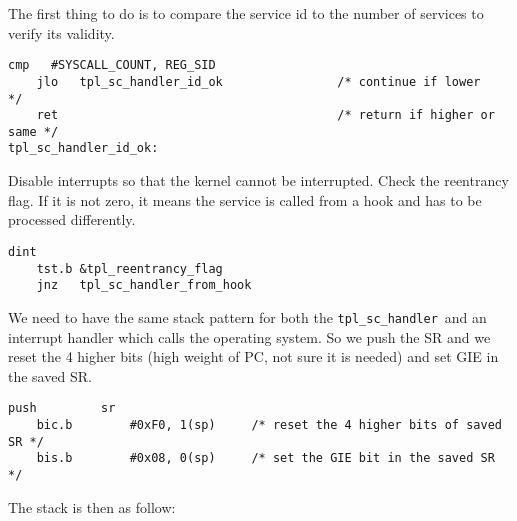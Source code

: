 \documentclass[11pt, oneside]{article}   	%
\newcommand{\sch}{\lstinline{tpl_sc_handler}}
\begin{document}

\vspace{1em}

The first thing to do is to compare the service id to the number of services to verify its validity.

\begin{lstlisting}[backgroundcolor=\color{yellow!15}]
    cmp   #SYSCALL_COUNT, REG_SID
    jlo   tpl_sc_handler_id_ok                /* continue if lower        */
    ret                                       /* return if higher or same */
tpl_sc_handler_id_ok:
\end{lstlisting}

Disable interrupts so that the kernel cannot be interrupted. Check the reentrancy flag. If it is not zero, it means the service is called from a hook and has to be processed differently.

\begin{lstlisting}[backgroundcolor=\color{yellow!15}]
    dint
    tst.b &tpl_reentrancy_flag
    jnz   tpl_sc_handler_from_hook
\end{lstlisting}


We need to have the same stack pattern for both the \sch\ and an interrupt handler which calls the operating system. So we push the SR
 and we reset the 4 higher bits (high weight of PC, not sure it is needed)
 and set GIE in the saved SR.

\begin{lstlisting}[backgroundcolor=\color{yellow!15}]
    push         sr
    bic.b        #0xF0, 1(sp)     /* reset the 4 higher bits of saved SR */
    bis.b        #0x08, 0(sp)     /* set the GIE bit in the saved SR     */
\end{lstlisting}

The stack is then as follow:
\end{document}
